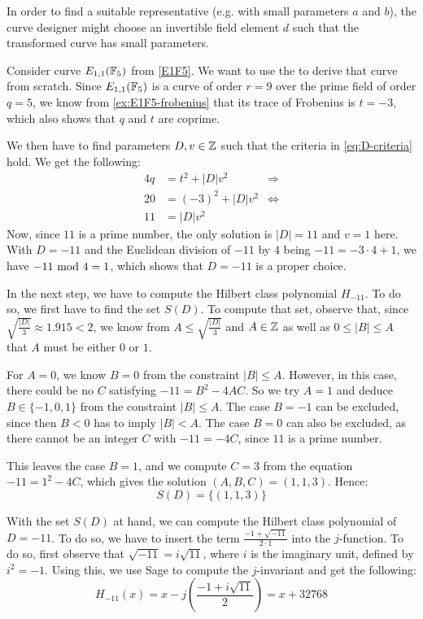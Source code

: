 In order to find a suitable representative (e.g. with small parameters $a$ and $b$), the curve designer might choose an invertible field element $d$ such that the transformed curve has small parameters.

\begin{example} Consider curve $E_{1,1}(\mathbb{F}_5)$ from \examplename{} \ref{E1F5}. We want to use the  to derive that curve from scratch. Since $E_{1,1}(\mathbb{F}_5)$ is a curve of order $r=9$ over the prime field of order $q=5$, we know from \examplename{} \ref{ex:E1F5-frobenius} that its trace of Frobenius is $t=-3$, which also shows that $q$ and $t$ are coprime. 

We then have to find parameters $D,v\in\mathbb{Z}$ such that the criteria in \ref{eq:D-criteria} hold. We get the following:
\begin{align*}
4q & = t^2+ |D|v^2 & \Rightarrow \\
20 & = (-3)^2 + |D|v^2 & \Leftrightarrow \\
11 & = |D|v^2
\end{align*}
Now, since $11$ is a prime number, the only solution is $|D|=11$ and $v=1$ here. With $D=-11$ and  the Euclidean division of $-11$ by $4$ being $-11 = -3\cdot 4 +1$, we have $-11 \text{ mod } 4=1$, which shows that $D=-11$ is a proper choice.

In the next step, we have to compute the Hilbert class polynomial $H_{-11}$. To do so, we first have to find the set $S(D)$. To compute that set, observe that, since $\sqrt{\frac{|D|}{3}}\approx 1.915<2$, we know from $A\leq \sqrt{\frac{|D|}{3}}$ and $A\in\mathbb{Z}$ as well as $0\leq |B|\leq A$ that $A$ must be either $0$ or $1$. 

For $A=0$, we know $B=0$ from the constraint $|B|\leq A$. However, in this case, there could be no $C$ satisfying $-11= B^2 -4AC$. So we try $A=1$ and deduce $B\in\{-1,0,1\}$ from the constraint $|B|\leq A$. The case $B=-1$ can be excluded, since then $B<0$ has to imply $|B|<A$. The case $B=0$ can also be excluded, as there cannot be an integer $C$ with $-11 = -4C$, since $11$ is a prime number. 

This leaves the case $B=1$, and we compute $C=3$ from the equation $-11 = 1^2 -4C$, which gives the solution $(A,B,C)=(1,1,3)$. Hence:
$$
S(D)=\{(1,1,3)\}
$$

With the set $S(D)$ at hand, we can compute the Hilbert class polynomial of $D=-11$. To do so, we have to insert the term $\frac{-1+\sqrt{-11}}{2\cdot1}$ into the $j$-function. To do so, first observe that $\sqrt{-11}=i\sqrt{11}$, where $i$ is the imaginary unit, defined by $i^2=-1$. Using this, we use Sage to compute the $j$-invariant and get the following:
$$
H_{-11}(x) = x - j\left(\frac{-1+i\sqrt{11}}{2}\right) = x + 32768
$$


\end{example}
